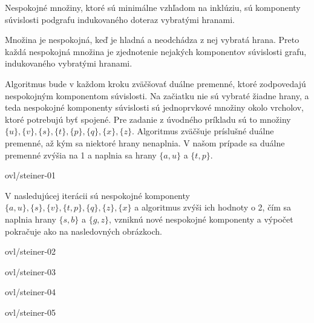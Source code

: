 \begin{lema}
Nespokojné množiny, ktoré sú minimálne vzhľadom na inklúziu, sú komponenty súvislosti podgrafu indukovaného
doteraz vybratými hranami.
\end{lema}

\begin{dokaz}
Množina je nespokojná, keď je hladná a neodchádza z nej vybratá hrana. Preto každá nespokojná množina je
zjednotenie nejakých komponentov súvislosti grafu, indukovaného vybratými hranami.
\end{dokaz}

\noindent
Algoritmus bude v každom kroku zväčšovať duálne premenné, ktoré zodpovedajú
nespokojným komponentom súvislosti. Na začiatku nie sú vybraté žiadne hrany, a teda nespokojné komponenty
súvislosti sú jednoprvkové množiny okolo vrcholov, ktoré potrebujú byť spojené. Pre zadanie z úvodného príkladu
sú to množiny $\{u\},\{v\},\{s\},\{t\},\{p\},\{q\},\{x\},\{z\}$. 
Algoritmus zväčšuje príslušné duálne premenné, až kým sa niektoré
hrany nenaplnia. V našom prípade sa duálne premenné zvýšia na 1 a naplnia sa hrany $\{a,u\}$ a $\{t,p\}$.


\begin{myfig}{\textwidth}{ovl/steiner-01}
\end{myfig}


\noindent
V nasledujúcej iterácii sú nespokojné komponenty $\{a,u\},\{s\},\{v\},\{t,p\},\{q\},\{z\},\{x\}$ a 
algoritmus zvýši ich hodnoty o 2, čím sa naplnia hrany $\{s,b\}$ a $\{g,z\}$, vzniknú nové nespokojné komponenty
a výpočet pokračuje ako na nasledovných obrázkoch.


\begin{minipage}[t]{0.5\textwidth}
\vskip 0pt
\begin{myfig}{\textwidth}{ovl/steiner-02}
\end{myfig}
\end{minipage}
\begin{minipage}[t]{0.5\textwidth}
\vskip 0pt
\begin{myfig}{\textwidth}{ovl/steiner-03}
\end{myfig}
\end{minipage}




\begin{minipage}[t]{0.5\textwidth}
\vskip 0pt
\begin{myfig}{\textwidth}{ovl/steiner-04}
\end{myfig}
\end{minipage}
\begin{minipage}[t]{0.5\textwidth}
\vskip 0pt
\begin{myfig}{\textwidth}{ovl/steiner-05}
\end{myfig}
\end{minipage}

